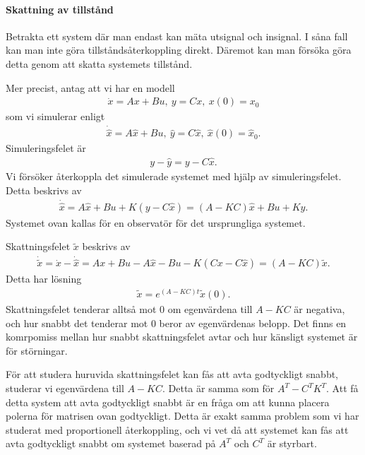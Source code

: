 \paragraph{Skattning av tillstånd}
Betrakta ett system där man endast kan mäta utsignal och insignal. I såna fall kan man inte göra tillståndsåterkoppling direkt. Däremot kan man försöka göra detta genom att skatta systemets tillstånd.

Mer precist, antag att vi har en modell
\begin{align*}
	\dot{x} = Ax + Bu,\ y = Cx,\ x(0) = x_{0}
\end{align*}
som vi simulerar enligt
\begin{align*}
	\dot{\hat{x}} = A\hat{x} + Bu,\  \hat{y} = C\hat{x},\ \hat{x}(0) = \hat{x}_{0}.
\end{align*}
Simuleringsfelet är
\begin{align*}
	y - \hat{y} = y - C\hat{x}.
\end{align*}
Vi försöker återkoppla det simulerade systemet med hjälp av simuleringsfelet. Detta beskrivs av
\begin{align*}
	\dot{\hat{x}} = A\hat{x} + Bu + K(y- C\hat{x}) = (A - KC)\hat{x} + Bu + Ky.
\end{align*}
Systemet ovan kallas för en observatör för det ursprungliga systemet.

Skattningsfelet $\tilde{x}$ beskrivs av
\begin{align*}
	\dot{\tilde{x}} = \dot{x} - \dot{\hat{x}} = Ax + Bu - A\hat{x} - Bu - K(Cx - C\hat{x}) = (A - KC)\tilde{x}.
\end{align*}
Detta har lösning
\begin{align*}
	\tilde{x} = e^{(A - KC)t}\tilde{x}(0).
\end{align*}
Skattningsfelet tenderar alltså mot $0$ om egenvärdena till $A - KC$ är negativa, och hur snabbt det tenderar mot $0$ beror av egenvärdenas belopp. Det finns en komrpomiss mellan hur snabbt skattningsfelet avtar och hur känsligt systemet är för störningar.

För att studera huruvida skattningsfelet kan fås att avta godtyckligt snabbt, studerar vi egenvärdena till $A - KC$. Detta är samma som för $A^{T} - C^{T}K^{T}$. Att få detta system att avta godtyckligt snabbt är en fråga om att kunna placera polerna för matrisen ovan godtyckligt. Detta är exakt samma problem som vi har studerat med proportionell återkoppling, och vi vet då att systemet kan fås att avta godtyckligt snabbt om systemet baserad på $A^{T}$ och $C^{T}$ är styrbart.

